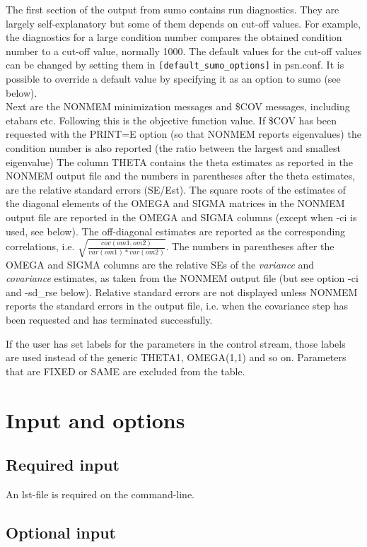 The first section of the output from sumo contains run diagnostics. They are largely self-explanatory but some of them depends on cut-off values. For example, the diagnostics for a large condition number compares the obtained condition number to a cut-off value, normally 1000. The default values for the cut-off values can be changed by setting them in 
\verb|[default_sumo_options]| in psn.conf. It is possible to override a default value by specifying it as an option to sumo (see below).
\\ 
Next are the NONMEM minimization messages and \$COV messages, including etabars etc. Following this is the objective function value. If \$COV has been requested with the PRINT=E option (so that NONMEM reports eigenvalues) the condition number is also reported (the ratio between the largest and smallest eigenvalue)
The column THETA contains the theta estimates as reported in the NONMEM output file and the numbers in parentheses after the theta estimates, are the relative standard errors (SE/Est). The square roots of the estimates of the diagonal elements of the OMEGA and SIGMA matrices in the NONMEM output file are reported in the OMEGA and SIGMA columns (except when -ci is used, see below). The off-diagonal estimates are reported as the corresponding correlations, i.e. 
$\sqrt{\frac{cov(om1,om2)}{var(om1)*var(om2)}}$. 
The numbers in parentheses after the OMEGA and SIGMA columns are the relative SEs of the \emph{variance} and \emph{covariance} estimates, as taken from the NONMEM output file
(but see option -ci and -sd\_rse below).
Relative standard errors are not displayed unless NONMEM reports the standard errors in the output file, i.e. when the covariance step has been requested and has terminated successfully.

If the user has set labels for the parameters in the control stream, those labels are used instead of the
generic THETA1, OMEGA(1,1) and so on. Parameters that are FIXED or SAME are excluded from the table.

\section{Input and options}

\subsection{Required input}
An lst-file is required on the command-line.

\subsection{Optional input}

